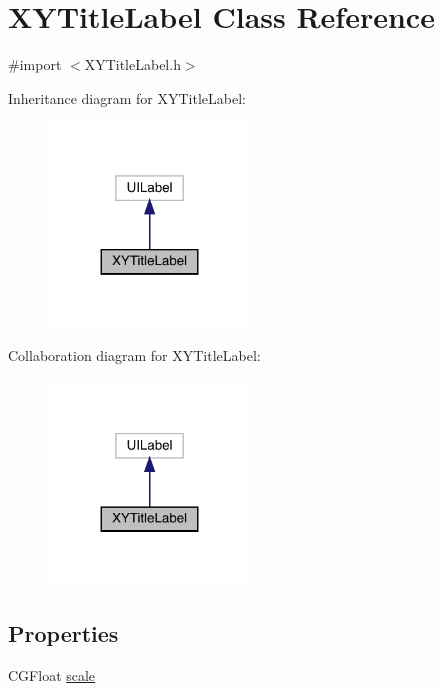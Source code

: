 \hypertarget{interface_x_y_title_label}{}\section{X\+Y\+Title\+Label Class Reference}
\label{interface_x_y_title_label}


{\ttfamily \#import $<$X\+Y\+Title\+Label.\+h$>$}



Inheritance diagram for X\+Y\+Title\+Label\+:\nopagebreak
\begin{figure}[H]
\begin{center}
\leavevmode
\includegraphics[width=152pt]{interface_x_y_title_label__inherit__graph}
\end{center}
\end{figure}


Collaboration diagram for X\+Y\+Title\+Label\+:\nopagebreak
\begin{figure}[H]
\begin{center}
\leavevmode
\includegraphics[width=152pt]{interface_x_y_title_label__coll__graph}
\end{center}
\end{figure}
\subsection*{Properties}
\begin{DoxyCompactItemize}
\item 
C\+G\+Float \mbox{\hyperlink{interface_x_y_title_label_af626ab6a0e22b12ac7c440baa0382e93}{scale}}
\end{DoxyCompactItemize}



